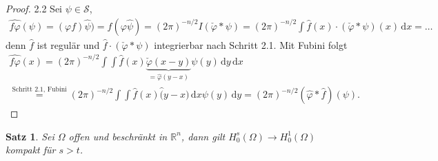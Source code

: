 \documentclass[
paper=a4,
bibtotocnumbered,
liststotocnumbered,
tablecaptionabove,
pointlessnumbers,
twoside,
openright,
10pt
]
{report}
\let\phi\varphi
\newtheorem{satz}[thm]{Satz}
\theoremstyle{definition}
\numberwithin{equation}{chapter}
\begin{document}
\begin{proof}
2.2 Sei  $\psi\in \mathcal S$,
\begin{gather}
\widehat{f\phi}(\psi) = (\phi f) \hat \psi) = f(\phi \hat \psi) = (2\pi)^{-n/2} I(\check \phi * \psi) = (2\pi)^{-n/2} \int \hat f(x) \cdot (\check \phi * \psi)(x) \, \mathrm dx =\ldots
\end{gather}
denn  $\hat f$ ist regulär und $\hat f \cdot (\check \phi * \psi)$ integrierbar nach Schritt 2.1. Mit Fubini folgt
\begin{gather}
\widehat{f\phi} (x) = (2\pi)^{-n/2} \int\int \hat f(x) \underbrace{\check \phi(x-y)}_{=\hat \phi(y-x)} \psi(y) \, \mathrm dy \, \mathrm dx\\
\stackrel{\text{Schritt 2.1}, \text{ Fubini}}= (2\pi)^{-n/2}\int \int \hat f(x) \hat (y-x) \, \mathrm dx \psi(y) \, \mathrm dy = (2\pi)^{-n/2} (\hat \phi * \hat f)(\psi).
\end{gather}
\end{proof}

\begin{satz}
Sei $\Omega$ offen und beschränkt in $\mathbb R^n$, dann gilt $H_0^s(\Omega) \to H_0^1(\Omega)$ kompakt für $s>t$.
\end{satz}
\end{document}
